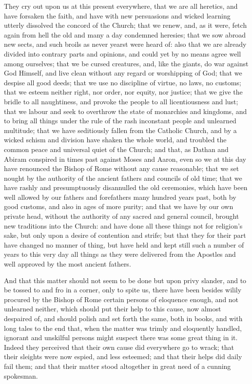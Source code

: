 They cry out upon us at this present everywhere, that we are all
heretics, and have forsaken the faith, and have with new persuasions
and wicked learning utterly dissolved the concord of the Church; that
we renew, and, as it were, fetch again from hell the old and many a
day condemned heresies; that we sow abroad new sects, and such broils
as never yearst were heard of: also that we are already divided into
contrary parts and opinions, and could yet by no means agree well among
ourselves; that we be cursed creatures, and, like the giants, do war
against God Himself, and live clean without any regard or worshipping
of God; that we despise all good deeds; that we use no discipline of
virtue, no laws, no customs; that we esteem neither right, nor order,
nor equity, nor justice;
that we give the bridle to all naughtiness, and provoke the people to
all licentiousness and lust; that we labour and seek to overthrow the
state of monarchies and kingdoms, and to bring all things under the
rule of the rash inconstant people and unlearned multitude; that we
have seditiously fallen from the Catholic Church, and by a wicked schism
and division have shaken the whole world, and troubled the common peace
and universal quiet of the Church; and that, as Dathan and Abiram conspired
in times past against Moses and Aaron, even so we at this day have renounced
the Bishop of Rome without any cause reasonable; that we set nought
by the authority of the ancient fathers and councils of old time; that
we have rashly and presumptuously disannulled the old ceremonies, which
have been well allowed by our fathers and forefathers many hundred years
past, both by good customs, and also in ages of more purity; and that
we have by our own private head, without the authority of any sacred
and general council, brought new traditions into the Church: and have
done all these things not for religion’s sake, but only upon a
desire of contention and strife; but that they for their part have changed
no manner of thing, but have held and kept still such a number of years
to this very day
all things as they were delivered from the Apostles and well approved
by the most ancient fathers.

And that this matter should not seem to be done but upon privy slander,
and to be tossed to and fro in a corner, only to spite us, there have
been besides wilily procured by the Bishop of Rome certain persons of
eloquence enough, and not unlearned neither, which should put their
help to this cause, now almost despaired of, and should polish and set
forth the same, both in books, and with long tales to the end that,
when the matter was trimly and eloquently handled, ignorant and unskilful
persons might suspect there was some great thing in it. Indeed
they perceived that their own cause did everywhere go to wrack; that
their sleights were now espied, and less esteemed; and that their helps
did daily fail them; and that their matter stood altogether in great
need of a cunning spokesman.

